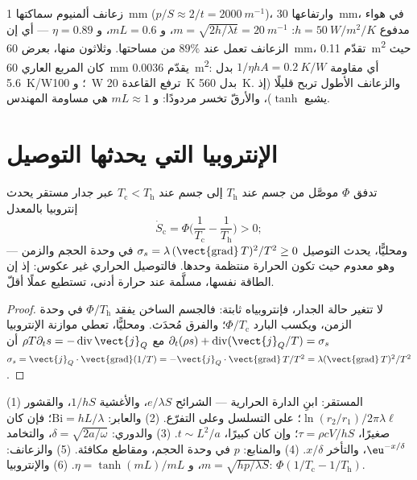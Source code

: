\begin{example}\label{ex:b2:heat-conduction:sink}
زعانف ألمنيوم سماكتها \qty{1}{mm} ($p/S \approx 2/t = \qty{2000}{m^{-1}}$)،
وارتفاعها \qty{30}{mm}، في هواء مدفوع $h = \qty{50}{W/m^2/K}$: $m =
\sqrt{2h/\lambda t} = \qty{20}{m^{-1}}$، و $mL = 0.6$، و $\eta = 0.89$ --- أي إن
الزعانف تعمل عند $89\%$ من مساحتها. وثلاثون منها، بعرض \qty{60}{mm}،
تقدّم \qty{0.11}{m^2} حيث كان المربع العاري \qty{60}{mm} يقدّم
\qty{0.0036}{m^2}: أي مقاومة $1/\eta hA = \qty{0.2}{K/W}$ بدل
\qty{5.6}{K/W}؛ و \qty{100}{W} ترفع القاعدة \qty{20}{K} بدل
\qty{560}{K}. والزعانف الأطول تربح قليلًا (إذ يشبع $\tanh$)، والأرقّ
تخسر مردودًا: و $mL \approx 1$ هي مساومة المهندس.
\end{example}

\section{الإنتروبيا التي يحدثها التوصيل}

\begin{proposition}\label{prop:b2:heat-conduction:entropy}
تدفق $\Phi$ موصَّل من جسم عند $T_{\text{h}}$ إلى جسم عند
$T_{\text{c}} < T_{\text{h}}$ عبر جدار مستقر يحدث إنتروبيا
بالمعدل
\[
\dot S_{\text{c}} = \Phi\Big(\frac{1}{T_{\text{c}}} - \frac{1}{T_{\text{h}}}\Big) > 0 ;
\]
ومحليًّا، يحدث التوصيل $\sigma_s = \lambda\,(\vect{\operatorname{grad}}\,T)^2/T^2
\ge 0$ في وحدة الحجم والزمن --- وهو معدوم حيث تكون الحرارة
منتظمة وحدها. فالتوصيل الحراري غير عكوس: إذ إن الطاقة نفسها، مسلَّمة عند
حرارة أدنى، تستطيع عملًا أقلّ.
\end{proposition}

\begin{proof}
لا تتغير حالة الجدار، فإنتروبياه ثابتة: فالجسم الساخن
يفقد $\Phi/T_{\text{h}}$ في وحدة الزمن، ويكسب البارد
$\Phi/T_{\text{c}}$؛ والفرق مُحدَث. ومحليًّا، تعطي موازنة
الإنتروبيا $\partial_t(\rho s) + \operatorname{div}(\vect{j}_Q/T) = \sigma_s$
مع $\rho T\partial_t s = -\operatorname{div}\vect{j}_Q$ أن $\sigma_s =
\vect{j}_Q\cdot\vect{\operatorname{grad}}(1/T) = -\vect{j}_Q\cdot
\vect{\operatorname{grad}}\,T/T^2 = \lambda(\vect{\operatorname{grad}}\,T)^2/T^2$.
\end{proof}

\begin{method}\label{meth:b2:heat-conduction:method}
(1) المستقر: ابنِ الدارة الحرارية --- الشرائح $e/\lambda S$، والأغشية
$1/hS$، والقشور $\ln(r_2/r_1)/2\pi\lambda\ell$؛ على التسلسل وعلى التفرّع.
(2) والعابر: $\mathrm{Bi} = hL/\lambda$؛ فإن كان صغيرًا، $\tau = \rho cV/hS$؛ وإن كان
كبيرًا، $t \sim L^2/a$. (3) والدوري: $\delta = \sqrt{2a/\omega}$، والتخامد
$\eu^{-x/\delta}$، والتأخر $x/\delta$. (4) والمنابع: $p$ في وحدة الحجم، ومقاطع
مكافئة. (5) والزعانف: $m = \sqrt{hp/\lambda S}$، و $\eta = \tanh(mL)/mL$. (6)
والإنتروبيا: $\Phi(1/T_{\text{c}} - 1/T_{\text{h}})$.
\end{method}

